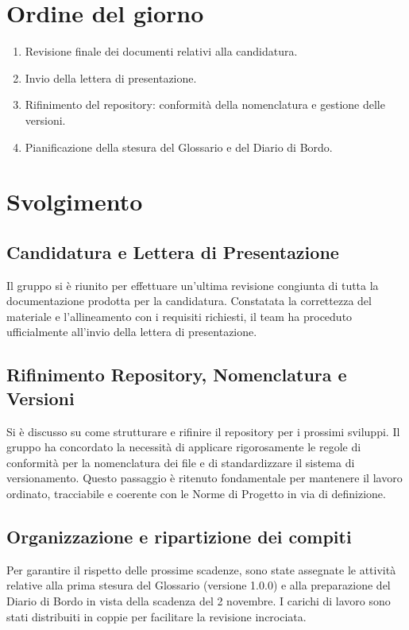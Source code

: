 \documentclass[interno]{gpt}
\begin{document}
\section{Ordine del giorno}
\begin{enumerate}
  \item Revisione finale dei documenti relativi alla candidatura.
  \item Invio della lettera di presentazione.
  \item Rifinimento del repository: conformità della nomenclatura e gestione delle versioni.
  \item Pianificazione della stesura del Glossario e del Diario di Bordo.
\end{enumerate}

\clearpage

\section{Svolgimento}
\subsection{Candidatura e Lettera di Presentazione}
Il gruppo si è riunito per effettuare un'ultima revisione congiunta di tutta la documentazione prodotta per la candidatura. Constatata la correttezza del materiale e l'allineamento con i requisiti richiesti, il team ha proceduto ufficialmente all'invio della lettera di presentazione.

\subsection{Rifinimento Repository, Nomenclatura e Versioni}
Si è discusso su come strutturare e rifinire il repository per i prossimi sviluppi. Il gruppo ha concordato la necessità di applicare rigorosamente le regole di conformità per la nomenclatura dei file e di standardizzare il sistema di versionamento. Questo passaggio è ritenuto fondamentale per mantenere il lavoro ordinato, tracciabile e coerente con le Norme di Progetto in via di definizione.

\subsection{Organizzazione e ripartizione dei compiti}
Per garantire il rispetto delle prossime scadenze, sono state assegnate le attività relative alla prima stesura del Glossario (versione 1.0.0) e alla preparazione del Diario di Bordo in vista della scadenza del 2 novembre. I carichi di lavoro sono stati distribuiti in coppie per facilitare la revisione incrociata.
\end{document}
